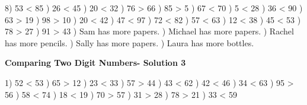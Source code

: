 \documentclass{article}%
\begin{document}
8) 53 < 85%
) 26 < 45%
) 20 < 32%
) 76 > 66%
) 85 > 5%
) 67 < 70%
) 5 < 28%
) 36 < 90%
) 63 > 19%
) 98 > 10%
) 20 < 42%
) 47 < 97%
) 72 < 82%
) 57 < 63%
) 12 < 38%
) 45 < 53%
) 78 > 27%
) 91 > 43%
) Sam has more papers.%
) Michael has more papers.%
) Rachel has more pencils.%
) Sally has more papers.%
) Laura has more bottles.%
\newline%
\newpage%
\large%
\begin{center}%
\textbf{Comparing Two Digit Numbers- Solution 3}%
\newline%
\end{center} \normalsize%
1) 52 < 53%
) 65 > 12%
) 23 < 33%
) 57 > 44%
) 43 < 62%
) 42 < 46%
) 34 < 63%
) 95 > 56%
) 58 < 74%
) 18 < 19%
) 70 > 57%
) 31 > 28%
) 78 > 21%
) 33 < 59%
\newline%
\end{document}

